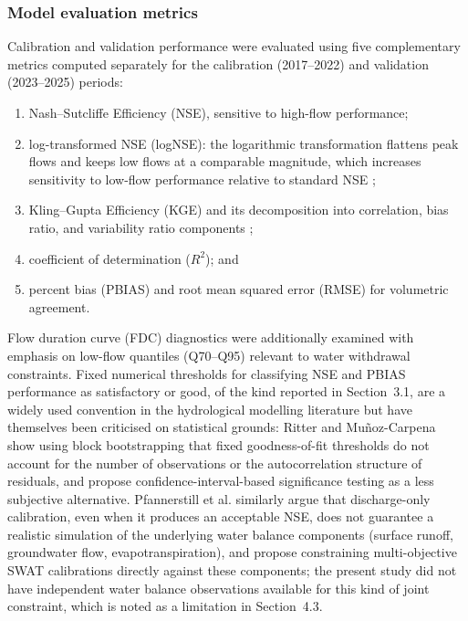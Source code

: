 \documentclass[draft]{agujournal2019}
\begin{document}
\subsubsection{Model evaluation metrics}
Calibration and validation performance were evaluated using five complementary metrics computed separately for the calibration (2017--2022) and validation (2023--2025) periods:

\begin{enumerate}
    \item Nash–Sutcliffe Efficiency (NSE), sensitive to high-flow performance;
    \item log-transformed NSE (logNSE): the logarithmic transformation flattens peak flows and keeps low flows at a comparable magnitude, which increases sensitivity to low-flow performance relative to standard NSE \cite{Krause2005};
    \item Kling–Gupta Efficiency (KGE) and its decomposition into correlation, bias ratio, and variability ratio components \cite{Gupta2009};
    \item coefficient of determination ($R^2$); and
    \item percent bias (PBIAS) and root mean squared error (RMSE) for volumetric agreement.
\end{enumerate}

Flow duration curve (FDC) diagnostics were additionally examined with emphasis on low-flow quantiles (Q70--Q95) relevant to water withdrawal constraints. Fixed numerical thresholds for classifying NSE and PBIAS performance as satisfactory or good, of the kind reported in Section~3.1, are a widely used convention in the hydrological modelling literature but have themselves been criticised on statistical grounds: Ritter and Mu\~noz-Carpena  show using block bootstrapping that fixed goodness-of-fit thresholds do not account for the number of observations or the autocorrelation structure of residuals, and propose confidence-interval-based significance testing as a less subjective alternative. Pfannerstill et al.  similarly argue that discharge-only calibration, even when it produces an acceptable NSE, does not guarantee a realistic simulation of the underlying water balance components (surface runoff, groundwater flow, evapotranspiration), and propose constraining multi-objective SWAT calibrations directly against these components; the present study did not have independent water balance observations available for this kind of joint constraint, which is noted as a limitation in Section~4.3.
\end{document}

